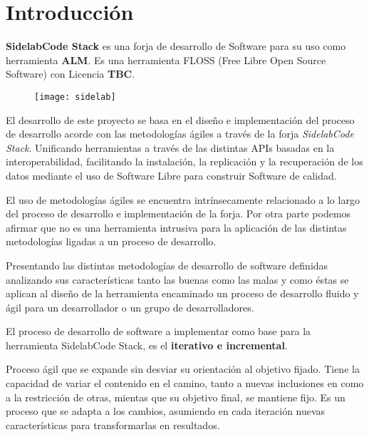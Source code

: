 \chapter{Introducci\'on}
\label{chap:introduccion}

\par \textbf{SidelabCode Stack} es una forja de desarrollo de Software para su uso como herramienta \textbf{ALM}. Es una herramienta FLOSS (Free Libre Open Source Software) con Licencia \textbf{TBC}.

\begin{figure}[h]
    \begin{center}	
        \texttt{[image: sidelab]}
        \label{fig:sidelab}
    \end{center}
\end{figure}

\par El desarrollo de este proyecto se basa en el dise\~no e implementaci\'on del proceso de desarrollo acorde con las metodolog\'ias \'agiles a trav\'es de la forja \emph{SidelabCode Stack}. Unificando herramientas a trav\'es de las distintas APIs basadas en la interoperabilidad, facilitando la instalaci\'on, la replicaci\'on y la recuperaci\'on de los datos mediante el uso de Software Libre para construir Software de calidad.

\par El uso de metodolog\'ias \'agiles se encuentra intr\'insecamente relacionado a lo largo del proceso de desarrollo e implementaci\'on de la forja. Por otra parte podemos afirmar que no es una herramienta intrusiva para la aplicaci\'on de las distintas metodolog\'ias ligadas a un proceso de desarrollo.

\par Presentando las distintas metodolog\'ias de desarrollo de software definidas analizando sus caracter\'isticas tanto las buenas como las malas y como \'estas se aplican al dise\~no de la herramienta encaminado un proceso de desarrollo fluido y \'agil para un desarrollador o un grupo de desarrolladores.

\par El proceso de desarrollo de software a implementar como base para la herramienta SidelabCode Stack, es el \textbf{iterativo e incremental}.

\par Proceso ágil que se expande sin desviar su orientación al objetivo fijado. Tiene la capacidad de variar el contenido en el camino, tanto a nuevas inclusiones en como a la restricción de otras, mientas que su objetivo final, se mantiene fijo. Es un proceso que se adapta a los cambios, asumiendo en cada iteración nuevas características para transformarlas en resultados.

